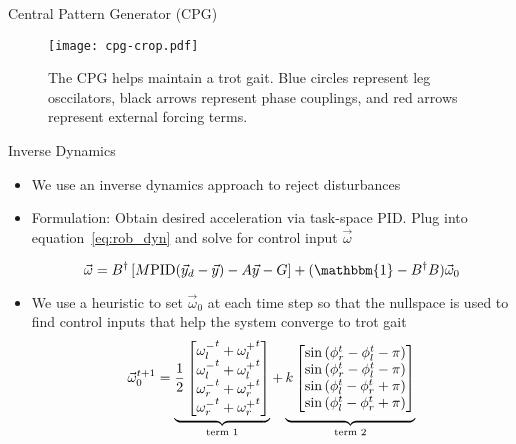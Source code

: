 \textcolor{prime}{\textsf{Central Pattern Generator (CPG)}} \\
\begin{figure}[h]
	\centering
    \texttt{[image: cpg-crop.pdf]}
    \caption{The CPG helps maintain a trot gait. Blue circles represent leg osccilators, black arrows represent phase couplings, and red arrows represent external forcing terms.}
    \label{fig:CPG_Network}
\end{figure}
\vspace{-0.25in}

\vspace{1EX}
\textcolor{prime}{\textsf{Inverse Dynamics}} \\
\begin{itemize}
\item We use an inverse dynamics approach to reject disturbances
\item Formulation: Obtain desired acceleration via task-space PID. Plug into equation~\ref{eq:rob_dyn} and solve for control input $\vec{\omega}$

    \begin{equation*}
        \vec{\omega} = B^{\dagger} \left[M \mathrm{PID}(\vec{y}_d - \vec{y})- A \vec{y} - G \right] + (\mathbbm{1} - B^{\dagger} B) \vec{\omega}_0 \label{eq:control}
    \end{equation*}

\item We use a heuristic to set $\vec{\omega}_0$ at each time step so that the nullspace is used to find control inputs that help the system converge to trot gait
\begin{equation}
    \vec{\omega}_0^{t+1} = \underbrace{\frac{1}{2}\begin{bmatrix}
        {\omega_l^-}^t + {\omega_l^+}^t \\
        {\omega_l^-}^t + {\omega_l^+}^t \\
        {\omega_r^-}^t + {\omega_r^+}^t \\
        {\omega_r^-}^t + {\omega_r^+}^t \\
    \end{bmatrix}}_{\text{term 1}} + 
    \underbrace{\vphantom{\frac{1}{2}\begin{bmatrix}
        {\omega_l^-}^t + {\omega_l^+}^t \\
        {\omega_l^-}^t + {\omega_l^+}^t \\
        {\omega_r^-}^t + {\omega_r^+}^t \\
        {\omega_r^-}^t + {\omega_r^+}^t \\
    \end{bmatrix}}
    k \begin{bmatrix}
        \sin \left( \phi_r^t - \phi_l^t - \pi \right) \\
        \sin \left( \phi_r^t - \phi_l^t - \pi \right) \\
        \sin \left( \phi_l^t - \phi_r^t + \pi \right) \\
        \sin \left( \phi_l^t - \phi_r^t + \pi \right) \\
    \end{bmatrix}}_{\text{term 2}}
    \label{eq:hu}
\end{equation}


\end{itemize}
